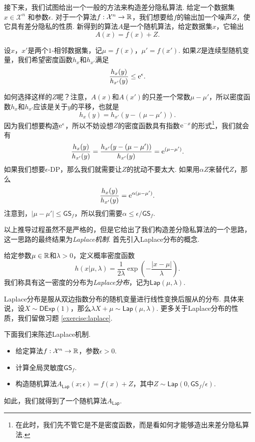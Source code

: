 接下来，我们试图给出一个一般的方法来构造差分隐私算法. 给定一个数据集$x \in \mathcal X^n$ 和参数$\epsilon$. 对于一个算法$f:\mathcal X^n \to \mathbb{R}$，我们想要给$f$的输出加一个噪声$Z$，使它具有差分隐私的性质. 新得到的算法$A$是一个随机算法，给定数据集$x$，它输出
\[
    A(x)=f(x)+Z.
\]

设$x$，$x'$是两个$1$-相邻数据集，记$\mu = f(x)$，$\mu' = f(x')$. 如果$Z$是连续型随机变量，我们希望密度函数$h_{x}$和$h_{x'}$满足
\[
    \frac{h_{x}(y)}{h_{x'}(y)} \leq \mathrm{e}^{\epsilon}.
\]

如何选择这样的$Z$呢？注意，$A(x)$和$A(x')$的只差一个常数$\mu - \mu'$，所以密度函数$h_{x}$和$h_{x'}$应该是关于$y$的平移，也就是
\[
    h_{x}(y) = h_{x'}(y - (\mu - \mu')).
\]
因为我们想要构造$\mathrm{e}^\epsilon$，所以不妨设想$Z$的密度函数具有指数$\mathrm{e}^{-x}$的形式\footnote{在此时，我们先不管它是不是密度函数，而是看如何才能够造出来差分隐私算法.}，我们就会有
\[
    \frac{h_{x}(y)}{h_{x'}(y)} = \frac{h_{x'}(y - (\mu - \mu'))}{h_{x'}(y)} = \mathrm{e}^{(\mu - \mu')}.
\]
如果我们想要$\epsilon$-DP，那么我们就需要让$Z$的扰动不要太大. 如果用$\alpha Z$来替代$Z$，那么
\[
    \frac{h_{x}(y)}{h_{x'}(y)} = \mathrm{e}^{\alpha(\mu - \mu')}.
\]
注意到，$|\mu - \mu'| \leq \mathsf{GS}_f$，所以我们需要$\alpha \leq \epsilon/\mathsf{GS}_f$.

以上推导过程虽然不是严格的，但是它给出了我们构造差分隐私算法的一个思路，这一思路的最终结果为\emph{Laplace机制}. 首先引入Laplace分布的概念.

\begin{definition}[Laplace分布]
    给定参数$\mu\in\mathbb{R}$和$\lambda>0$，定义概率密度函数
        \[h(x  | \mu, \lambda) = \frac1{2\lambda}\exp\left(- \frac{|x - \mu|}{\lambda}\right).\]
我们称具有这一密度的分布为\emph{Laplace分布}，记为$\mathsf{Lap}(\mu,\lambda)$.
\end{definition}

Laplace分布是服从双边指数分布的随机变量进行线性变换后服从的分布. 具体来说，设$X\sim\mathsf{DExp}(1)$，那么$\lambda X+\mu\sim\mathsf{Lap}(\mu,\lambda)$. 更多关于Laplace分布的性质，我们留做习题 \ref{exercise:laplace}.

下面我们来陈述Laplace机制.

\begin{itemize}
    \item 给定算法$f:\mathcal X^n \to \mathbb{R}$，参数$\epsilon>0$.
    \item 计算全局灵敏度$\mathsf{GS}_f$.
    \item 构造随机算法$A_{\mathsf{Lap}}(x;\epsilon) = f(x) + Z$，其中$Z\sim \mathsf{Lap}(0, \mathsf{GS}_f/\epsilon)$.
\end{itemize}
如此，我们就得到了一个随机算法$A_{\mathsf{Lap}}$. 


